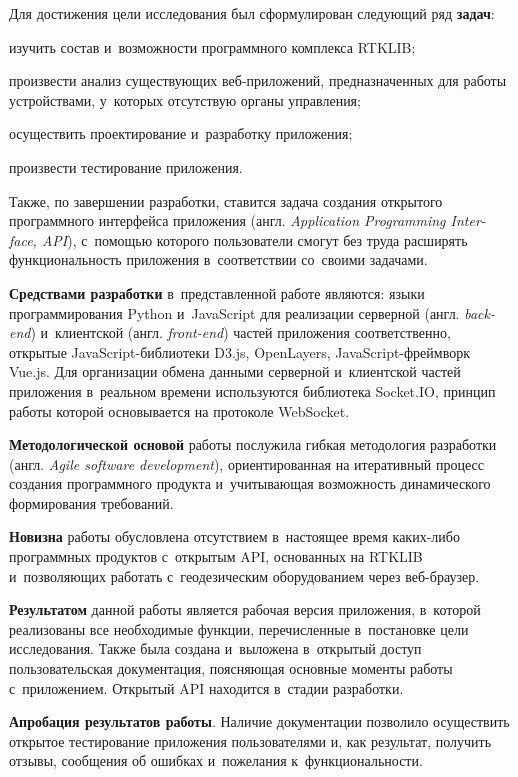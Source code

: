 Для достижения цели исследования был сформулирован следующий ряд \textbf{задач}:

\begin{dashitemize}
  \item изучить состав и~возможности программного комплекса RTKLIB;
  \item произвести анализ существующих веб-приложений, предназначенных для работы устройствами, у~которых отсутствую органы управления;
  \item осуществить проектирование и~разработку приложения;
  \item произвести тестирование приложения.
\end{dashitemize}

Также, по завершении разработки, ставится задача создания открытого программного интерфейса приложения (англ. \emph{Application Programming Inter-face, API}), с~помощью которого пользователи смогут без труда расширять функциональность приложения в~соответствии со~своими задачами. \par

\textbf{Средствами разработки} в~представленной работе являются: языки программирования Python и~JavaScript для реализации серверной (англ. \emph{back-end}) и~клиентской (англ. \emph{front-end}) частей приложения соответственно, открытые JavaScript-библиотеки D3.js, OpenLayers, JavaScript-фреймворк Vue.js. Для организации обмена данными серверной и~клиентской частей приложения в~реальном времени используются библиотека Socket.IO, принцип работы которой основывается на протоколе WebSocket. \par

\textbf{Методологической основой} работы послужила гибкая методология разработки (англ. \emph{Agile software development}), ориентированная на итеративный процесс создания программного продукта и~учитывающая возможность динамического формирования требований. \par

\textbf{Новизна} работы обусловлена отсутствием в~настоящее время каких-либо программных продуктов с~открытым API, основанных на RTKLIB и~позволяющих работать с~геодезическим оборудованием через веб-браузер. \par

\textbf{Результатом} данной работы является рабочая версия приложения, в~которой реализованы все необходимые функции, перечисленные в~постановке цели исследования. Также была создана и~выложена в~открытый доступ пользовательская документация, поясняющая основные моменты работы с~приложением. Открытый API находится в~стадии разработки. \par

\textbf{Апробация результатов работы}. Наличие документации позволило осуществить открытое тестирование приложения пользователями и, как результат, получить отзывы, сообщения об ошибках и~пожелания к~функциональности. \par


\newpage
